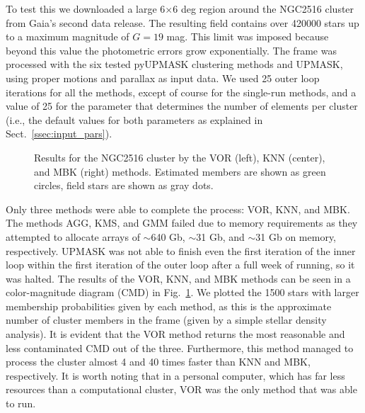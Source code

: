 \documentclass[draft]{aa}
\providecommand{\DIFaddtex}[1]{{\protect\color{blue}\uwave{#1}}} %
\providecommand{\DIFaddbegin}{} %
\providecommand{\DIFaddend}{} %
\providecommand{\DIFadd}[1]{\texorpdfstring{\DIFaddtex{#1}}{#1}} %
\newcommand{\DIFaddincludegraphics}[2][]{{\color{blue}\fbox{\DIFOincludegraphics[#1]{#2}}}} %
\DeclareRobustCommand{\DIFaddbegin}{\DIFOaddbegin \let\includegraphics\DIFaddincludegraphics} %
\DeclareRobustCommand{\DIFaddend}{\DIFOaddend \let\includegraphics\DIFOincludegraphics} %
\begin{document}
 To test this we downloaded a large 6$\times$6 deg region around the NGC2516
 cluster from Gaia's second data release\DIFaddbegin \DIFadd{~\mbox{%
\citep{GaiaDR2_2018}}\hspace{0pt}%
}\DIFaddend . The resulting
 field contains over 420000 stars up to a maximum magnitude of $G=19$ mag. This
 limit was imposed because beyond this value the photometric errors grow
 exponentially.
 The frame was processed with the six tested pyUPMASK clustering methods
 and UPMASK, using proper motions and parallax as input data. We used 25
 outer loop iterations for all the methods, except of course for
 the single-run methods, and a value of 25 for the parameter that determines
 the number of elements per cluster (i.e., the default values for both
 parameters as explained in Sect.~\ref{ssec:input_pars}).\\

 \begin{figure}
 \caption{Results for the NGC2516 cluster by the VOR (left), KNN (center), and
 MBK (right) methods. Estimated members are shown as green circles, field stars
 are shown as gray dots.}
 \label{fig:NGC2516}
 \end{figure}

 Only three methods were able to complete the process: VOR, KNN, and MBK. The
 methods AGG, KMS, and GMM failed due to memory requirements as they
 attempted to allocate arrays of $\sim$640 Gb, $\sim$31 Gb, and
 $\sim$31 Gb on memory, respectively. UPMASK was not able to finish even the
 first iteration of the inner loop within the first iteration of the outer loop
 after a full week of running, so it was halted.
 The results of the VOR, KNN, and MBK methods can be seen in a color-magnitude
 diagram (CMD) in Fig.~\ref{fig:NGC2516}. We plotted the 1500 stars with larger
 membership probabilities given by each method, as this is the approximate
 number of cluster members in the frame (given by a simple stellar density
 analysis). It is evident that the VOR method returns the most reasonable and
 less contaminated CMD out of the three. Furthermore, this method managed to
 process the cluster almost 4 and 40 times faster than KNN and MBK,
 respectively. It is worth noting that in a personal computer, which has far
 less resources than a computational cluster, VOR was the only method that
 was able to run.\\
\end{document}
